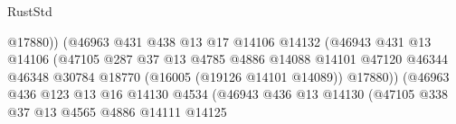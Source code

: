 \begin{lexlean}{RustStd}
\begin{coremodule}
                                                  @17880))
                                              (@46963
                                                @431
                                                @438
                                                @13
                                                @17
                                                @14106
                                                @14132
                                                (@46943
                                                  @431
                                                  @13
                                                  @14106
                                                  (@47105
                                                    @287
                                                    @37
                                                    @13
                                                    @4785
                                                    @4886
                                                    @14088
                                                    @14101
                                                    @47120
                                                    @46344
                                                    @46348
                                                    @30784
                                                    @18770
                                                    (@16005 (@19126 @14101 @14089))
                                                    @17880))
                                                (@46963
                                                  @436
                                                  @123
                                                  @13
                                                  @16
                                                  @14130
                                                  @4534
                                                  (@46943
                                                    @436
                                                    @13
                                                    @14130
                                                    (@47105
                                                      @338
                                                      @37
                                                      @13
                                                      @4565
                                                      @4886
                                                      @14111
                                                      @14125

\end{coremodule}
\end{lexlean}
